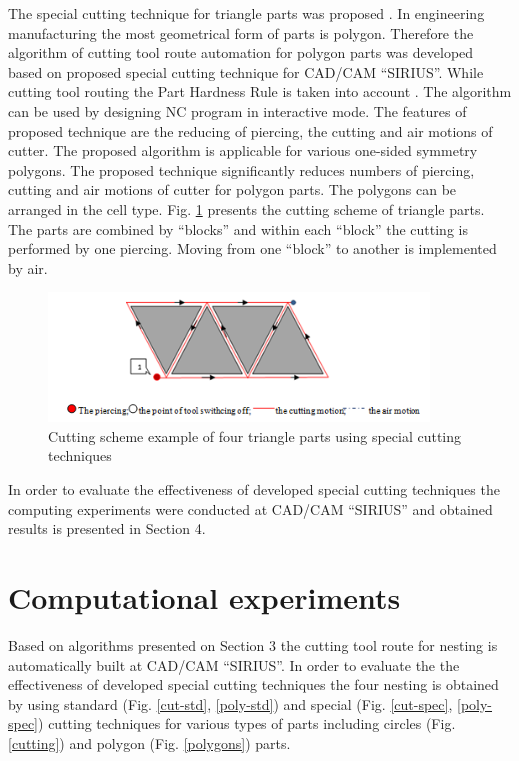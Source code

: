 \documentclass[runningheads]{llncs}
\begin{document}
The special cutting technique for triangle parts was proposed \cite{ru26}.
In engineering manufacturing the most geometrical form of parts is polygon.
Therefore the algorithm of cutting tool route automation for polygon parts
was developed based on proposed special cutting technique for CAD/CAM ``SIRIUS''.
While cutting tool routing the Part Hardness Rule is taken into account \cite{ru27}.
The algorithm can be used by designing NC program in interactive mode.
The features of proposed technique are the reducing of piercing,
the cutting and air motions of cutter.
The proposed algorithm is applicable for various one-sided symmetry polygons.
The proposed technique significantly reduces numbers of piercing,
cutting and air motions of cutter for polygon parts.
The polygons can be arranged in the cell type.
Fig. \ref{tri} presents the cutting scheme of triangle parts.
The parts are combined by ``blocks'' and within each ``block''
the cutting is performed by one piercing.
Moving from one ``block'' to another is implemented by air.

\begin{figure}
  \begin{center}
  \includegraphics[width=0.9\textwidth]{tri.png}
  \caption{Cutting scheme example of four triangle parts using special cutting techniques}
  \label{tri}
  \end{center}
\end{figure}

In order to evaluate the effectiveness
of developed special cutting techniques
the computing experiments were conducted at CAD/CAM ``SIRIUS''
and obtained results is presented in Section 4.

\section{Computational experiments}

Based on algorithms presented on Section 3
the cutting tool route for nesting is automatically built at CAD/CAM ``SIRIUS''.
In order to evaluate the the effectiveness of developed special cutting techniques
the four nesting is obtained by using standard (Fig. \ref{cut-std}, \ref{poly-std})
and special (Fig. \ref{cut-spec}, \ref{poly-spec})
cutting techniques for various types of parts including circles
(Fig. \ref{cutting}) and polygon (Fig. \ref{polygons}) parts.
\end{document}
